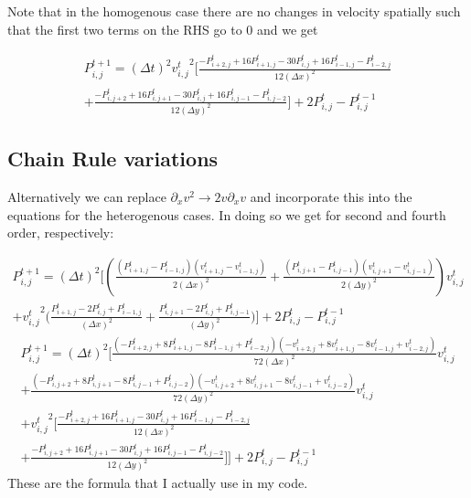 \documentclass{article}
\begin{document}
Note that in the homogenous case there are no changes in velocity spatially such that the first two terms on the RHS go to 0 and we get 

\begin{multline*}
P_{i,j}^{t+1} = (\Delta t)^2 {v_{i,j}^{t}}^2 \Big[\frac{-P_{i+2,j}^{t} + 16P_{i+1,j}^{t} -30P_{i,j}^{t} +16P_{i-1,j}^{t} - P_{i-2,j}^{t} }{12(\Delta x)^2} \\
+ \frac{-P_{i,j+2}^{t} + 16P_{i,j+1}^{t} -30P_{i,j}^{t} + 16P_{i,j-1}^{t} - P_{i,j-2}^{t} }{12(\Delta y)^2}\Big] + 2P_{i,j}^{t} - P_{i,j}^{t-1}
\end{multline*}


\subsection{Chain Rule variations}
Alternatively we can replace $\partial_xv^2 \rightarrow  2v\partial_x v$ and incorporate this into the equations for the heterogenous cases. In doing so we get for second and fourth order, respectively: 

\begin{multline*}
P_{i,j}^{t+1} = (\Delta t)^2\Bigg[(\frac{(P_{i+1,j}^{t} - P_{i-1,j}^{t})({v_{i+1,j}^{t}} - {v_{i-1,j}^{t}})}{2(\Delta x)^2} + \frac{(P_{i,j+1}^{t} - P_{i,j-1}^{t})({v_{i,j+1}^{t}} - {v_{i,j-1}^{t}})}{2(\Delta y)^2}) v^t_{i,j} \\
+ {v_{i,j}^{t}}^2\Big( \frac{P_{i+1,j}^{t} - 2P_{i,j}^{t} + P_{i-1,j}^{t}}{(\Delta x)^2} + \frac{P_{i,j+1}^{t} - 2P_{i,j}^{t} + P_{i,j-1}^{t}}{(\Delta y)^2} \Big) \Bigg] + 2P_{i,j}^{t} - P_{i,j}^{t-1}
\end{multline*}
\begin{multline*}
P_{i,j}^{t+1} = (\Delta t)^2\Bigg[ \frac{(-P_{i+2,j}^{t} + 8P_{i+1,j}^{t} -8P_{i-1,j}^{t} + P_{i-2,j}^{t}) (-{v_{i+2,j}^{t}} + 8{v_{i+1,j}^{t}} -8{v_{i-1,j}^{t}} + {v_{i-2,j}^{t}} ) }{72 (\Delta x)^2}v^t_{i,j} \\
+ \frac{(-P_{i,j+2}^{t} + 8P_{i,j+1}^{t} -8P_{i,j-1}^{t} + P_{i,j-2}^{t}) (-{v_{i,j+2}^{t}} + 8{v_{i,j+1}^{t}} -8{v_{i,j-1}^{t}} + {v_{i,j-2}^{t}} ) }{72 (\Delta y)^2}v^t_{i,j} \\
+ {v_{i,j}^{t}}^2 \Big[\frac{-P_{i+2,j}^{t} + 16P_{i+1,j}^{t} -30P_{i,j}^{t} +16P_{i-1,j}^{t} - P_{i-2,j}^{t} }{12(\Delta x)^2} \\
+ \frac{-P_{i,j+2}^{t} + 16P_{i,j+1}^{t} -30P_{i,j}^{t} + 16P_{i,j-1}^{t} - P_{i,j-2}^{t} }{12(\Delta y)^2}\Big] \Bigg] + 2P_{i,j}^{t} - P_{i,j}^{t-1}
\end{multline*}
These are the formula that I actually use in my code. 
\end{document}
